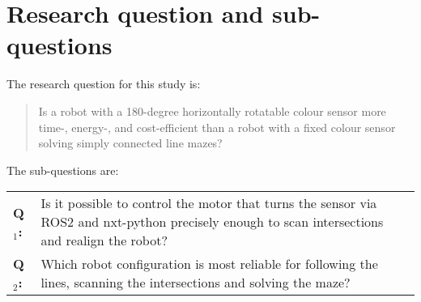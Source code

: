 \section{Research question and sub-questions}

The research question for this study is: 

\begin{quote}
    Is a robot with a 180-degree horizontally rotatable colour sensor more time-, energy-, and cost-efficient than a robot with a fixed colour sensor solving simply connected line mazes?
\end{quote}

\noindent The sub-questions are:\\

\begin{tabular}{p{1cm} p{12cm}}
    \textbf{Q$_{1}$:} & Is it possible to control the motor that turns the sensor via ROS2 and nxt-python precisely enough to scan intersections and realign the robot? \\
    \textbf{Q$_{2}$:} & Which robot configuration is most reliable for following the lines, scanning the intersections and solving the maze?
\end{tabular}
